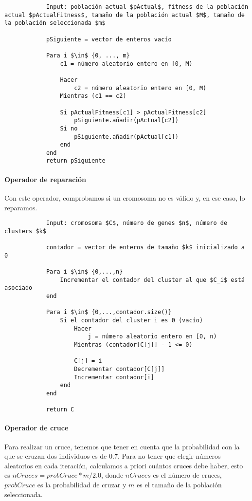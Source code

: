 		\footnotesize
		\begin{lstlisting}
			Input: población actual $pActual$, fitness de la población actual $pActualFitness$, tamaño de la población actual $M$, tamaño de la población seleccionada $m$

			pSiguiente = vector de enteros vacío

			Para i $\in$ {0, ..., m}
				c1 = número aleatorio entero en [0, M)

				Hacer 
					c2 = número aleatorio entero en [0, M)
				Mientras (c1 == c2)

				Si pActualFitness[c1] > pActualFitness[c2] 
					pSiguiente.añadir(pActual[c2])
				Si no
					pSiguiente.añadir(pActual[c1])
				end 
			end
			return pSiguiente
		\end{lstlisting}
		\normalsize
		
		\paragraph{Operador de reparación}
		$ $\\
		Con este operador, comprobamos si un cromosoma no es válido y, en ese caso, lo reparamos.

		\footnotesize 
		\begin{lstlisting}
			Input: cromosoma $C$, número de genes $n$, número de clusters $k$

			contador = vector de enteros de tamaño $k$ inicializado a 0
			
			Para i $\in$ {0,...,n}
				Incrementar el contador del cluster al que $C_i$ está asociado
			end
			
			Para i $\in$ {0,...,contador.size()}
				Si el contador del cluster i es 0 (vacío)
					Hacer 
						j = número aleatorio entero en [0, n)
					Mientras (contador[C[j]] - 1 <= 0)

					C[j] = i
					Decrementar contador[C[j]]
					Incrementar contador[i]
				end
			end

			return C
		\end{lstlisting}
		\normalsize

		\paragraph{Operador de cruce}
		$ $\\
		Para realizar un cruce, tenemos que tener en cuenta que la probabilidad con la que se cruzan dos individuos es de $0.7$.
		Para no tener que elegir números aleatorios en cada iteración, calculamos a priori cuántos cruces debe haber, esto es $nCruces = probCruce * m/2.0$,
		donde $nCruces$ es el número de cruces, $probCruce$ es la probabilidad de cruzar y $m$ es el tamaño de la población seleccionada.

